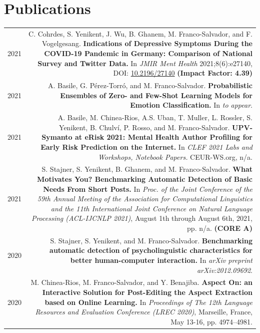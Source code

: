 \documentclass[10pt]{article}
\begin{document}
\section*{Publications}
\begin{tabular}{L!{\VRule}R}
	2021 & C. Cohrdes, S. Yenikent, J. Wu, B. Ghanem, M. Franco-Salvador, and F. Vogelgesang. \textbf{Indications of Depressive Symptoms During the COVID-19 Pandemic in Germany: Comparison of National Survey and Twitter Data.}
	In \emph{JMIR Ment Health} 2021;8(6):e27140, DOI: \href{https://doi.org/10.2196/27140}{10.2196/27140} \textbf{(Impact Factor: 4.39)} \vspace{5pt}\\
	2021 & A. Basile, G. P{\'e}rez-Torr{\'o}, and M. Franco-Salvador. \textbf{Probabilistic Ensembles of Zero- and Few-Shot Learning Models for Emotion Classification.}
	In \emph{to appear}. \vspace{5pt}\\
	2021 & A. Basile, M. Chinea-Rios, A.S. Uban, T. Muller, L. Rossler, S. Yenikent, B. Chulv{\'i}, P. Rosso, and M. Franco-Salvador. \textbf{UPV-Symanto at eRisk 2021: Mental Health Author Profiling for Early Risk Prediction on the Internet.}
	In \emph{CLEF 2021 Labs and Workshops, Notebook Papers.} CEUR-WS.org, n/a. \vspace{5pt}\\
	2021 & S. Stajner, S. Yenikent, B. Ghanem, and M. Franco-Salvador. \textbf{What Motivates You? Benchmarking Automatic Detection of Basic Needs From Short Posts.}
	In \emph{Proc. of the Joint Conference of the 59th Annual Meeting of the Association for Computational Linguistics and the 11th International Joint Conference on Natural Language Processing (ACL-IJCNLP 2021)}, August 1th through August 6th, 2021, pp. n/a. \textbf{(CORE A)}\vspace{5pt}\\
	2020 & S. Stajner, S. Yenikent, and M. Franco-Salvador. \textbf{Benchmarking automatic detection of psycholinguistic characteristics for better human-computer interaction.}
	In \emph{arXiv preprint arXiv:2012.09692}.\vspace{5pt}\\	
	2020 & M. Chinea-Rios, M. Franco-Salvador, and Y. Benajiba. \textbf{Aspect On: an Interactive Solution for Post-Editing the Aspect Extraction based on Online Learning.}
	In \emph{Proceedings of The 12th Language Resources and Evaluation Conference (LREC 2020)}, Marseille, France, May 13-16, pp. 4974--4981.\vspace{5pt}\\	

\end{tabular}
\end{document}
